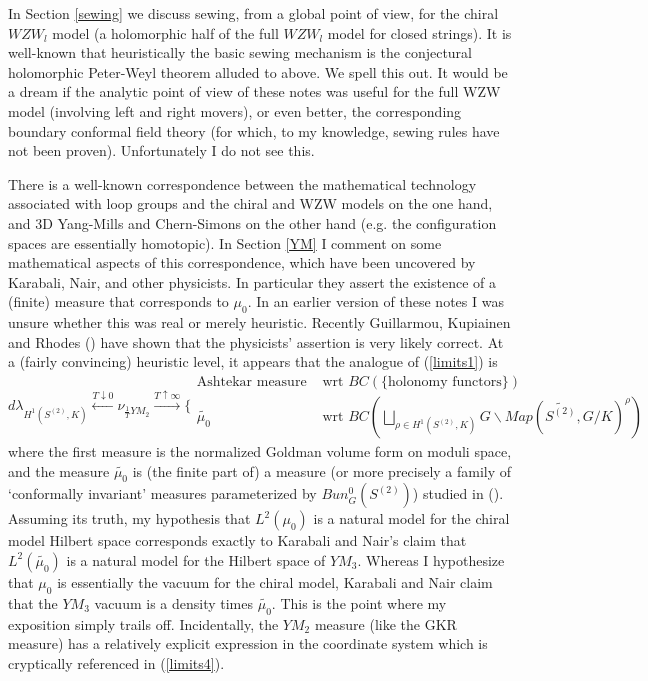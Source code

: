 \documentclass{amsart}
\theoremstyle{conjecture}
\theoremstyle{definition}
\theoremstyle{question}
\theoremstyle{questions}
\theoremstyle{remark}
\theoremstyle{remarks}
\theoremstyle{example}
\numberwithin{equation}{section}
\begin{document}
In Section \ref{sewing} we discuss sewing, from a global point of view, for the chiral $WZW_l$ model (a holomorphic half of the full $WZW_l$ model for closed strings). It is well-known that heuristically the basic sewing mechanism is the conjectural holomorphic Peter-Weyl theorem alluded to above. We spell this out. It would be a dream if the 
analytic point of view of these notes was useful for the full WZW model (involving left and right movers), or even better, the corresponding boundary conformal field theory (for which, to my knowledge, sewing rules have not been proven). Unfortunately I do not see this.

There is a well-known correspondence between the mathematical technology associated with loop groups and the chiral and WZW models on the one hand, and 3D Yang-Mills and Chern-Simons on the other hand (e.g. the configuration spaces are essentially homotopic). In Section \ref{YM} I comment on some mathematical aspects of this correspondence, which have been uncovered by Karabali, Nair, and other physicists. In particular they assert the existence of a (finite) measure that corresponds to $\mu_0$. In an earlier version of these notes
I was unsure whether this was real or merely heuristic. Recently Guillarmou, Kupiainen and Rhodes (\cite{GKR}) have shown that the physicists' assertion is very likely correct. 
At a (fairly convincing) heuristic level, it appears that the analogue of (\ref{limits1}) is 
\begin{equation}\label{limits4}d\lambda_{H^1(S^{(2)},K)} \stackrel{T\downarrow 0}{\leftarrow} \nu_{\frac 1T YM_2}\stackrel{T\uparrow \infty}{\rightarrow} \{ \begin{matrix} \text{Ashtekar measure}& \text{ wrt } BC(\{\text{holonomy functors}\}) \\ \widetilde{\mu_0}& \text{ wrt } BC(\bigsqcup_{\rho\in H^1(S^{(2)},K)}G\backslash Map(\widetilde{S^{(2)}},G/K)^{\rho})  \end{matrix}\end{equation}
where the first measure is the normalized Goldman volume form on moduli space, and the measure $\widetilde {\mu_0}$ is (the finite part of) a measure (or more precisely a family of `conformally invariant' measures parameterized by $Bun_G^0(S^{(2)})$) studied in (\cite{GKR}). Assuming its truth, my hypothesis that $L^2(\mu_0)$ is a natural model for the chiral model Hilbert space corresponds exactly to Karabali and Nair's claim that $L^2(\widetilde{\mu_0})$ is a natural model for the Hilbert space of $YM_3$. Whereas I hypothesize that $\mu_0$ is essentially the vacuum for the chiral model, Karabali and Nair claim that the $YM_3$ vacuum is a density times $\widetilde{\mu_0}$. This is the point where my exposition simply trails off. Incidentally, the $YM_2$ measure (like the GKR measure) has a relatively explicit
expression in the coordinate system which is cryptically referenced in (\ref{limits4}). 
\end{document}
